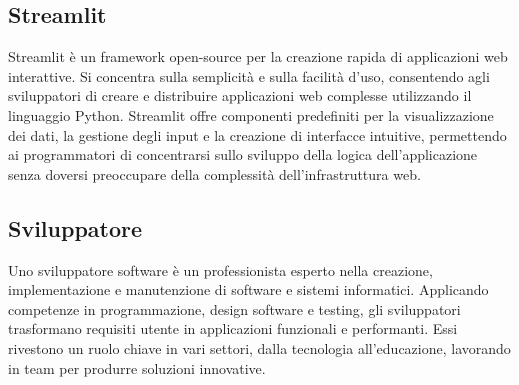 \vspace{2em}
\subsection*{Streamlit}
\par Streamlit è un framework open-source per la creazione rapida di applicazioni web interattive. Si concentra sulla semplicità e sulla facilità d'uso, consentendo agli sviluppatori di creare e distribuire applicazioni web complesse utilizzando il linguaggio Python. Streamlit offre componenti predefiniti per la visualizzazione dei dati, la gestione degli input e la creazione di interfacce intuitive, permettendo ai programmatori di concentrarsi sullo sviluppo della logica dell'applicazione senza doversi preoccupare della complessità dell'infrastruttura web.

\vspace{2em}
\subsection*{Sviluppatore}
\par Uno sviluppatore software è un professionista esperto nella creazione, implementazione e manutenzione di software e sistemi informatici. Applicando competenze in programmazione, design software e testing, gli sviluppatori trasformano requisiti utente in applicazioni funzionali e performanti. Essi rivestono un ruolo chiave in vari settori, dalla tecnologia all'educazione, lavorando in team per produrre soluzioni innovative.
